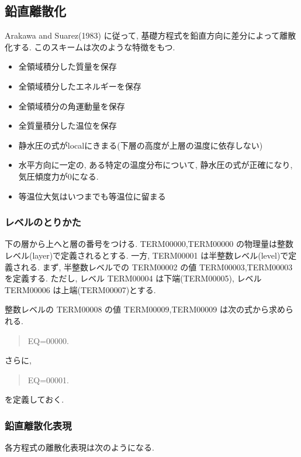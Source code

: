 ﻿
\subsection{鉛直離散化}

Arakawa and Suarez(1983) に従って, 
基礎方程式を鉛直方向に差分によって離散化する.
このスキームは次のような特徴をもつ.
%
\begin{itemize}
\item 全領域積分した質量を保存
\item 全領域積分したエネルギーを保存
\item 全領域積分の角運動量を保存
\item 全質量積分した温位を保存
\item 静水圧の式がlocalにきまる(下層の高度が上層の温度に依存しない)
\item 水平方向に一定の, ある特定の温度分布について,
      静水圧の式が正確になり, 気圧傾度力が0になる.
\item 等温位大気はいつまでも等温位に留まる
\end{itemize}      

\subsubsection{レベルのとりかた}

下の層から上へと層の番号をつける.
TERM00000,TERM00000 の物理量は整数レベル(layer)で定義されるとする.
一方, TERM00001 は半整数レベル(level)で定義される.
%
まず, 半整数レベルでの TERM00002 の値
TERM00003,TERM00003
を定義する.
%
ただし, レベル TERM00004 は下端(TERM00005),
レベル TERM00006 は上端(TERM00007)とする.

整数レベルの TERM00008 の値
TERM00009,TERM00009
は次の式から求められる.
%
\begin{quote}
EQ=00000.
\label{しぐま定義}
\end{quote}
%
さらに,
\begin{quote}
EQ=00001.
\label{しぐま厚さ}
\end{quote}
を定義しておく.

\subsubsection{鉛直離散化表現}

各方程式の離散化表現は次のようになる.

